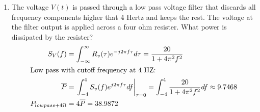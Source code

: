 \begin{enumerate}
\begin{enumerate}
    \end{enumerate}
  \item The voltage $V(t)$ is passed through a low pass voltage filter that discards all frequency components higher that 4 Hertz and keeps the rest. The voltage at the filter output is applied across a four ohm resister. What power is dissipated by the resister? \\
    \begin{align*}
      S_V(f) & = \int_{-\infty}^{\infty}R_v(\tau) e^{-j 2\pi f \tau} d\tau = \dfrac{20}{1 + 4\pi^2f^2} \\
      \shortintertext{Low pass with cutoff frequency at 4 HZ:}
      \overline{P} & = \left. \int_{-4}^{4}S_v(f) e^{j 2\pi f \tau} df \right|_{\tau = 0}
               = \int_{-4}^{4} \dfrac{20}{1 + 4\pi^2f^2} df \approx 9.7468 \\
      P_{low pass + 4 \Omega} & = 4 \overline{P} = 38.9872
    \end{align*}
  \end{enumerate}

